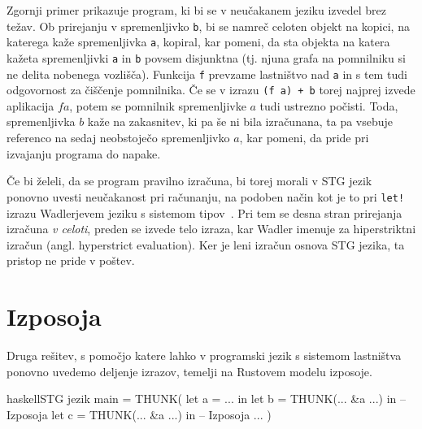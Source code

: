 Zgornji primer prikazuje program, ki bi se v neučakanem jeziku izvedel brez težav. Ob prirejanju v spremenljivko \texttt{b}, bi se namreč celoten objekt na kopici, na katerega kaže spremenljivka \texttt{a}, kopiral, kar pomeni, da sta objekta na katera kažeta spremenljivki \texttt{a} in \texttt{b} povsem disjunktna (tj. njuna grafa na pomnilniku si ne delita nobenega vozlišča). Funkcija \texttt{f} prevzame lastništvo nad \texttt{a} in s tem tudi odgovornost za čiščenje pomnilnika. Če se v izrazu \texttt{(f a) + b} torej najprej izvede aplikacija $f a$, potem se pomnilnik spremenljivke $a$ tudi ustrezno počisti. Toda, spremenljivka $b$ kaže na zakasnitev, ki pa še ni bila izračunana, ta pa vsebuje referenco na sedaj neobstoječo spremenljivko $a$, kar pomeni, da pride pri izvajanju programa do napake.

Če bi želeli, da se program pravilno izračuna, bi torej morali v STG jezik ponovno uvesti neučakanost pri računanju, na podoben način kot je to pri \texttt{let!} izrazu Wadlerjevem jeziku s sistemom  tipov~\cite{wadler1990linear}. Pri tem se desna stran prirejanja izračuna \emph{v celoti}, preden se izvede telo izraza, kar Wadler imenuje za hiperstriktni izračun (angl. hyperstrict evaluation). Ker je leni izračun osnova STG jezika, ta pristop ne pride v poštev.

\section{Izposoja}

Druga rešitev, s pomočjo katere lahko v programski jezik s sistemom lastništva ponovno uvedemo deljenje izrazov, temelji na Rustovem modelu izposoje.


\begin{code-box}{haskell}{STG jezik}
main = THUNK(
    let a = ... in
    let b = THUNK(... &a ...) in -- Izposoja
    let c = THUNK(... &a ...) in -- Izposoja
        ...
)
\end{code-box}


